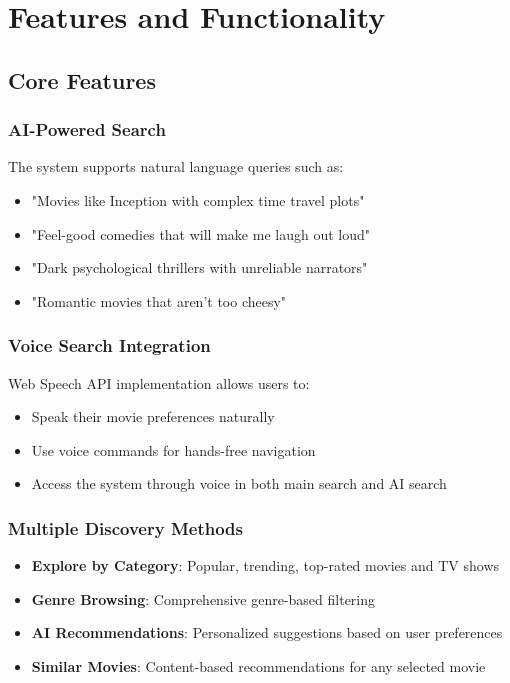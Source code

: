 \documentclass[12pt,a4paper]{article}
\begin{document}
\section{Features and Functionality}

\subsection{Core Features}

\subsubsection{AI-Powered Search}
The system supports natural language queries such as:
\begin{itemize}
    \item "Movies like Inception with complex time travel plots"
    \item "Feel-good comedies that will make me laugh out loud"
    \item "Dark psychological thrillers with unreliable narrators"
    \item "Romantic movies that aren't too cheesy"
\end{itemize}

\subsubsection{Voice Search Integration}
Web Speech API implementation allows users to:
\begin{itemize}
    \item Speak their movie preferences naturally
    \item Use voice commands for hands-free navigation
    \item Access the system through voice in both main search and AI search
\end{itemize}

\subsubsection{Multiple Discovery Methods}
\begin{itemize}
    \item \textbf{Explore by Category}: Popular, trending, top-rated movies and TV shows
    \item \textbf{Genre Browsing}: Comprehensive genre-based filtering
    \item \textbf{AI Recommendations}: Personalized suggestions based on user preferences
    \item \textbf{Similar Movies}: Content-based recommendations for any selected movie
\end{itemize}
\end{document}
